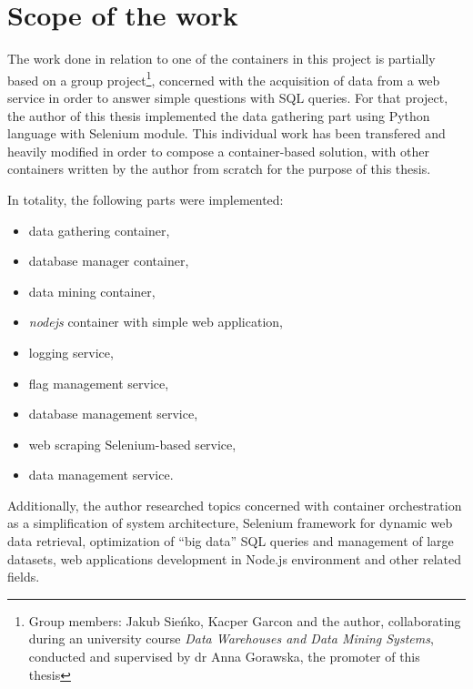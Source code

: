 \section{Scope of the work}
The work done in relation to one of the containers in this project is partially based on a group project\footnote{Group members: Jakub Sieńko, Kacper Garcon and the author, collaborating during an university course \textit{Data Warehouses and Data Mining Systems}, conducted and supervised by dr Anna Gorawska, the promoter of this thesis}, concerned with the acquisition of data from a web service in order to answer simple questions with SQL queries. For that project, the author of this thesis implemented the data gathering part using Python language with Selenium module. This individual work has been transfered and heavily modified in order to compose a container-based solution, with other containers written by the author from scratch for the purpose of this thesis. \par
In totality, the following parts were implemented:
\begin{itemize}
    \item data gathering container,
    \item database manager container,
    \item data mining container,
    \item \textit{nodejs} container with simple web application,
    \item logging service,
    \item flag management service,
    \item database management service,
    \item web scraping Selenium-based service,
    \item data management service.
\end{itemize}
Additionally, the author researched topics concerned with container orchestration as a simplification of system architecture, Selenium framework for dynamic web data retrieval, optimization of ``big data'' SQL queries and management of large datasets, web applications development in Node.js environment and other related fields.


